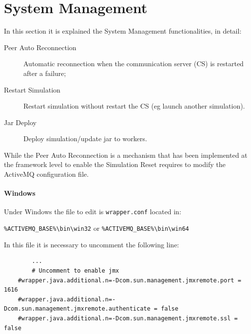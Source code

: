 \documentclass{article}
\begin{document}
\begin{figure}[h!]
\end{figure}

\section{System Management}

In this section it is explained the System Management functionalities, in detail:
\begin{description}
	\item[Peer Auto Reconnection] Automatic reconnection when the communication server (CS) is restarted after a failure;
	\item[Restart Simulation] Restart simulation without restart the CS (eg launch another simulation).
	\item[Jar Deploy] Deploy simulation/update jar to workers.
\end{description}

While the Peer Auto Reconnection is a mechanism that has been implemented at the framework level to enable the Simulation Reset requires to modify the ActiveMQ configuration file.

\paragraph*{Windows}
Under Windows the file to edit is \texttt{wrapper.conf} located in: 

\verb|%ACTIVEMQ_BASE%\bin\win32| or \verb|%ACTIVEMQ_BASE%\bin\win64|

In this file it is necessary to uncomment the following line:

\begin{lstlisting}
    	...
    	# Uncomment to enable jmx
	#wrapper.java.additional.n=-Dcom.sun.management.jmxremote.port = 1616
	#wrapper.java.additional.n=-Dcom.sun.management.jmxremote.authenticate = false
	#wrapper.java.additional.n=-Dcom.sun.management.jmxremote.ssl = false
\end{lstlisting}
\end{document}
